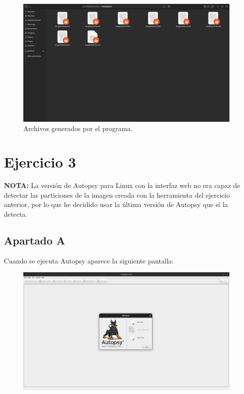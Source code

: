 \documentclass{article}
\begin{document}
\begin{figure}[H]
    \centering
    \includegraphics[width=\textwidth]{imagenes/Captura desde 2022-12-02 19-50-53.png}
    \caption{Archivos generados por el programa.}
\end{figure}

\section*{Ejercicio 3}

\textbf{NOTA: }La versión de Autopsy para Linux con la interfaz web no era capaz de detectar las particiones de la imagen creada con la herramienta del ejercicio anterior, por lo que he decidido usar la última versión de Autopsy que sí la detecta.

\subsection*{Apartado A}

Cuando se ejecuta Autopsy aparece la siguiente pantalla:

\begin{figure}[H]
    \centering
    \includegraphics[width=\textwidth]{imagenes/Captura desde 2022-12-03 21-22-16.png}
\end{figure}
\end{document}

